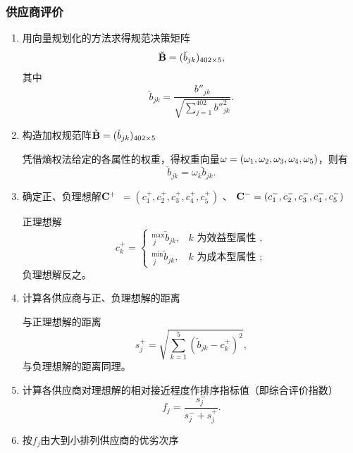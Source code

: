 \subsubsection{供应商评价}

\begin{enumerate}

\item 用向量规划化的方法求得规范决策矩阵
\begin{equation}
 \breve{\bf{B}} =(\breve{b}_{jk})_{402 \times 5},
\end{equation}
其中
\begin{equation}
    \breve{b}_{jk}=\frac{{b''}_{jk}}{\sqrt{\sum_{j=1}^{402}{b''}_{jk}^2}}.
\end{equation}

\item 构造加权规范阵$ \check{\bf{B}}  =(\check{b}_{jk})_{402 \times 5}$

凭借熵权法给定的各属性的权重，得权重向量${\bf{\omega}} =(\omega_1,\omega_2,\omega_3,\omega_4,\omega_5)$，则有
\begin{equation}
    \check{b}_{jk}=\omega_k\breve{b}_{jk}.
\end{equation}
\item 确定正、负理想解$ \bf C^+$ $=(c_1^+,c_2^+,c_3^+,c_4^+,c_5^+)$
、
${\bf C^{-}}=(c_1^-,c_2^-,c_3^-,c_4^-,c_5^-)$

正理想解
\begin{equation}
c_{k}^{+}=\left\{\begin{array}{ll}
{ }_{\ j}^{\max } \check{b}_{jk}, & k \text { 为效益型属性 }, \\
{ }_{\ j}^{\min } \check{b}_{jk}, & k \text { 为成本型属性 };
\end{array}\right.
\end{equation}
负理想解反之。

\item 计算各供应商与正、负理想解的距离

与正理想解的距离
\begin{equation}
    s_j^+=\sqrt{\sum_{k=1}^5(\check{b}_{jk}-c_k^+)^2} ,
\end{equation}
与负理想解的距离同理。
\item 计算各供应商对理想解的相对接近程度作排序指标值（即综合评价指数）
\begin{equation}
    f_j=\frac{s_j^-}{s_j^-+s_j^+}.
\end{equation}
\item 按$f_j$由大到小排列供应商的优劣次序

\end{enumerate}

